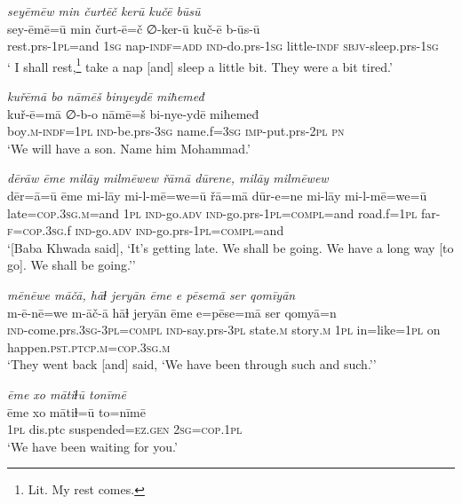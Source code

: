 \ea \label{BP.182}
\textit{seyēmēw min čurtēč kerū kučē būsū} \\ 
\gll sey-ēmē=ū min čurt-ē=č ∅-ker-ū kuč-ē b-ūs-ū \\ 
 rest.prs-\textsc{1pl}=and \textsc{1sg} nap\textsc{-indf}\textsc{=add} \textsc{ind-}do.prs\textsc{-\textsc{1sg}} little\textsc{-indf} \textsc{sbjv-}sleep.prs\textsc{-\textsc{1sg}} \\ 
\glt ` I shall rest,\footnote{Lit. My rest comes.} take a nap [and] sleep a little bit. They were a bit tired.'
\z 
 
\ea \label{BP.186}
\textit{kuřēmā bo nāmēš binyeydē miħemeđ} \\ 
\gll kuř-ē=mā ∅-b-o nāmē=š bi-nye-ydē miħemeđ \\ 
 boy\textsc{.m}\textsc{-indf}\textsc{=\textsc{1pl}} \textsc{ind-}be.prs\textsc{-3sg} name.f\textsc{=3sg} \textsc{imp-}put.prs-\textsc{2pl} \textsc{pn} \\ 
\glt `We will have a son. Name him Mohammad.'
\z 
 
\ea \label{BP.191}
\textit{dērāw ēme milāy milmēwew řāmā dūrene, milāy milmēwew} \\ 
\gll dēr=ā=ū ēme mi-lāy mi-l-mē=we=ū řā=mā dūr-e=ne mi-lāy mi-l-mē=we=ū \\ 
 late\textsc{=cop}\textsc{.3sg}\textsc{.m}=and \textsc{1pl} \textsc{ind-}go\textsc{.adv} \textsc{ind-}go.prs\textsc{-\textsc{1pl}}\textsc{=compl}=and road.f\textsc{=\textsc{1pl}} far\textsc{-f}\textsc{=cop}\textsc{.3sg}.f \textsc{ind-}go\textsc{.adv} \textsc{ind-}go.prs\textsc{-\textsc{1pl}}\textsc{=compl}=and \\ 
\glt `[Baba Khwada said], ‘It’s getting late. We shall be going. We have a long way [to go]. We shall be going.’'
\z 
 
\ea \label{BP.202}
\textit{mēnēwe māčā, hāɫ jeryān ēme e pēsemā ser qomīyān} \\ 
\gll m-ē-nē=we m-āč-ā hāɫ jeryān ēme e=pēse=mā ser qomyā=n \\ 
 \textsc{ind-}come.prs\textsc{.3sg}\textsc{-3pl}\textsc{=compl} \textsc{ind-}say.prs\textsc{-3pl} state\textsc{.m} story\textsc{.m} \textsc{1pl} in=like\textsc{=\textsc{1pl}} on happen\textsc{.pst}\textsc{.ptcp}\textsc{.m}\textsc{=cop}\textsc{.3sg}\textsc{.m} \\ 
\glt `They went back [and] said, ‘We have been through such and such.’'
\z 
 
\ea \label{ŠJ.31}
\textit{ēme xo mātiɫū tonīmē} \\ 
\gll ēme xo mātiɫ=ū to=nīmē \\ 
 \textsc{1pl} dis.ptc suspended\textsc{=ez.gen} \textsc{2sg}\textsc{=cop}\textsc{.\textsc{1pl}} \\ 
\glt `We have been waiting for you.'
\z 
 
